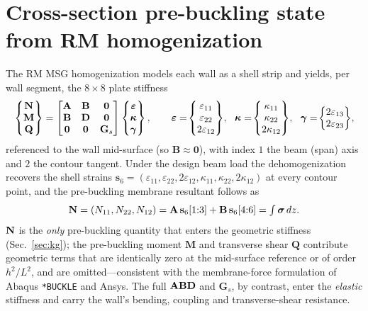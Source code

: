 \section{Cross-section pre-buckling state from RM homogenization}\label{sec:pre}
The RM MSG homogenization models each wall as a shell strip and yields, per wall segment, the
$8\times8$ plate stiffness
\begin{equation}
\begin{Bmatrix}\NN\\ \mathbf M\\ \mathbf Q\end{Bmatrix}
=\begin{bmatrix}\mathbf A&\mathbf B&\mathbf 0\\ \mathbf B&\mathbf D&\mathbf 0\\ \mathbf 0&\mathbf 0&\mathbf G_s\end{bmatrix}
\begin{Bmatrix}\boldsymbol\varepsilon\\ \boldsymbol\kappa\\ \boldsymbol\gamma\end{Bmatrix},\qquad
\boldsymbol\varepsilon=\!\begin{Bmatrix}\varepsilon_{11}\\\varepsilon_{22}\\2\varepsilon_{12}\end{Bmatrix}\!,\ \
\boldsymbol\kappa=\!\begin{Bmatrix}\kappa_{11}\\\kappa_{22}\\2\kappa_{12}\end{Bmatrix}\!,\ \
\boldsymbol\gamma=\!\begin{Bmatrix}2\varepsilon_{13}\\2\varepsilon_{23}\end{Bmatrix}\!,
\label{eq:abd}
\end{equation}
referenced to the wall mid-surface (so $\mathbf B\!\approx\!\bm0$), with index $1$ the beam (span) axis and
$2$ the contour tangent. Under the design beam load the dehomogenization recovers the shell strains
$\mathbf s_6=(\varepsilon_{11},\varepsilon_{22},2\varepsilon_{12},\kappa_{11},\kappa_{22},2\kappa_{12})$
at every contour point, and the pre-buckling membrane resultant follows as
\begin{equation}
\mathbf{N}=(N_{11},N_{22},N_{12})=\mathbf A\,\mathbf s_6[1{:}3]+\mathbf B\,\mathbf s_6[4{:}6]
=\textstyle\int \boldsymbol\sigma\,dz .
\label{eq:N}
\end{equation}
$\mathbf{N}$ is the \emph{only} pre-buckling quantity that enters the geometric stiffness (Sec.~\ref{sec:kg}); the
pre-buckling moment $\mathbf M$ and transverse shear $\mathbf Q$ contribute geometric terms that are
identically zero at the mid-surface reference or of order $h^2/L^2$, and are omitted---consistent with the
membrane-force formulation of Abaqus \texttt{*BUCKLE} and Ansys. The full $\mathbf{ABD}$ and $\mathbf G_s$, by
contrast, enter the \emph{elastic} stiffness and carry the wall's bending, coupling and transverse-shear
resistance.


